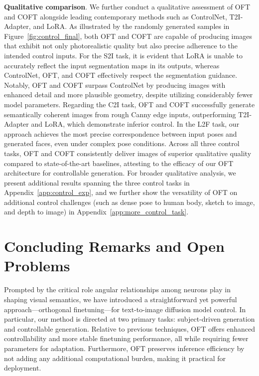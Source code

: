 \textbf{Qualitative comparison}. We further conduct a qualitative assessment of OFT and COFT alongside leading contemporary methods such as ControlNet, T2I-Adapter, and LoRA. As illustrated by the randomly generated samples in Figure~\ref{fig:control_final}, both OFT and COFT are capable of producing images that exhibit not only photorealistic quality but also precise adherence to the intended control inputs. For the S2I task, it is evident that LoRA is unable to accurately reflect the input segmentation maps in its outputs, whereas ControlNet, OFT, and COFT effectively respect the segmentation guidance. Notably, OFT and COFT surpass ControlNet by producing images with enhanced detail and more plausible geometry, despite utilizing considerably fewer model parameters. Regarding the C2I task, OFT and COFT successfully generate semantically coherent images from rough Canny edge inputs, outperforming T2I-Adapter and LoRA, which demonstrate inferior control. In the L2F task, our approach achieves the most precise correspondence between input poses and generated faces, even under complex pose conditions. Across all three control tasks, OFT and COFT consistently deliver images of superior qualitative quality compared to state-of-the-art baselines, attesting to the efficacy of our OFT architecture for controllable generation. For broader qualitative analysis, we present additional results spanning the three control tasks in Appendix~\ref{app:control_exp}, and we further show the versatility of OFT on additional control challenges (such as dense pose to human body, sketch to image, and depth to image) in Appendix~\ref{app:more_control_task}.

\section{Concluding Remarks and Open Problems}

Prompted by the critical role angular relationships among neurons play in shaping visual semantics, we have introduced a straightforward yet powerful approach—orthogonal finetuning—for text-to-image diffusion model control. In particular, our method is directed at two primary tasks: subject-driven generation and controllable generation. Relative to previous techniques, OFT offers enhanced controllability and more stable finetuning performance, all while requiring fewer parameters for adaptation. Furthermore, OFT preserves inference efficiency by not adding any additional computational burden, making it practical for deployment.

